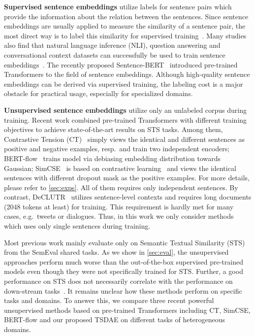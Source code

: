 \documentclass[11pt]{article}
\begin{document}
\textbf{Supervised sentence embeddings} utilize labels for sentence pairs which provide the information about the relation between the sentences. Since sentence embeddings are usually applied to measure the similarity of a sentence pair, the most direct way is to label this similarity for supervised training~\citep{DBLP:journals/corr/HendersonASSLGK17}. Many studies also find that natural language inference (NLI), question answering and conversational context datasets can successfully be used to train sentence embeddings~\citep{conneau-EtAl:2017:EMNLP2017,DBLP:conf/emnlp/CerYKHLJCGYTSK18}. The recently proposed Sentence-BERT~\citep{DBLP:conf/emnlp/ReimersG19} introduced pre-trained Transformers to the field of sentence embeddings. Although high-quality sentence embeddings can be derived via supervised training, the labeling cost is a major obstacle for practical usage, especially for specialized domains.

\textbf{Unsupervised sentence embeddings} utilize only an unlabeled corpus during training. Recent work combined pre-trained Transformers with different training objectives to achieve state-of-the-art results on STS tasks. Among them,  Contrastive Tension (CT)~\citep{DBLP:journals/corr/abs-2006-03659} simply views the identical and different sentences as positive and negative examples, resp.\ and train two independent encoders; BERT-flow~\citep{DBLP:conf/emnlp/LiZHWYL20} trains model via debiasing embedding distribution towards Gaussian; SimCSE~\citep{gao2021simcse} is based on contrastive learning~\citep{DBLP:conf/cvpr/HadsellCL06,DBLP:conf/icml/ChenK0H20} and views the identical sentences with different dropout mask as the positive examples. For more details, please refer to \autoref{sec:exps}. All of them requires only independent sentences. By contrast, DeCLUTR~\citep{DBLP:journals/corr/abs-2006-03659} utilizes sentence-level contexts and requires long documents (2048 tokens at least) for training. This requirement is hardly met for many cases, e.g.\ tweets or dialogues. Thus, in this work we only consider methods which uses only single sentences during training.

Most previous work mainly evaluate only on Semantic Textual Similarity (STS) from the SemEval shared tasks. As we show in \autoref{sec:eval}, the unsupervised approaches perform much worse than the out-of-the-box supervised pre-trained models even though they were not specifically trained for STS. Further, a good performance on STS does not necessarily correlate with the performance on down-stream tasks~\citep{DBLP:conf/coling/ReimersBG16}. It remains unclear how these methods perform on specific tasks and domains. To answer this, we compare three recent powerful unsupervised methods based on pre-trained Transformers including CT, SimCSE, BERT-flow and our proposed TSDAE on different tasks of heterogeneous domains. 
\end{document}
